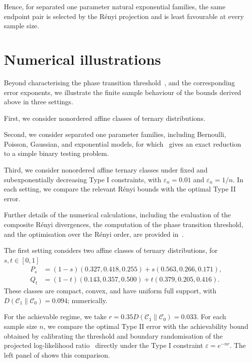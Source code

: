 \documentclass[journal,10pt,draftclsnofoot,onecolumn]{IEEEtran}
\begin{document}
Hence, for separated one parameter natural exponential families, the same endpoint pair is selected by the R\'enyi projection and is least favourable at every sample size.
 
\section{Numerical illustrations}
\label{sec:numerical-illustrations}

Beyond characterising the phase transition threshold~, and the corresponding error exponents, we illustrate the finite sample behaviour of the bounds derived above in three settings. 

First, we consider nonordered affine classes of ternary distributions. 

Second, we consider separated one parameter families, including Bernoulli, Poisson, Gaussian, and exponential models, for which~ gives an exact reduction to a simple binary testing problem. 

Third, we consider nonordered affine ternary classes under fixed and subexponentially decreasing Type I constraints, with $\varepsilon_n=0.01$ and $\varepsilon_n=1/n$. In each setting, we compare the relevant R\'enyi bounds with the optimal Type II error. 

Further details of the numerical calculations, including the evaluation of the composite R\'enyi divergences, the computation of the phase transition threshold, and the optimisation over the R\'enyi order, are provided in~.

The first setting considers two affine classes of ternary distributions, for $s,t\in[0,1]$
\begin{equation*}
\begin{aligned}
P_s&=(1-s)(0.327,0.418,0.255) +s(0.563,0.266,0.171),\\
Q_t&=(1-t)(0.143,0.357,0.500) +t(0.379,0.205,0.416).
\end{aligned}
\end{equation*}
These classes are compact, convex, and have uniform full support, with $D(\mathcal C_1\|\mathcal C_0)=0.094$; numerically. 

For the achievable regime, we take $r=0.35D(\mathcal C_1\|\mathcal C_0)=0.033$. For each sample size $n$, we compare the optimal Type II error with the achievability bound obtained by calibrating the threshold and boundary randomisation of the projected log-likelihood ratio~ directly under the Type I constraint $\varepsilon=e^{-nr}$. The left panel of  shows this comparison.
\end{document}
